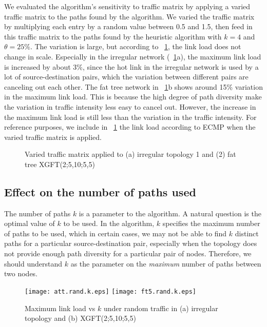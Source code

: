 \documentclass[conference]{IEEEtran}
\begin{document}
We evaluated the algorithm's sensitivity to traffic matrix by applying a varied
traffic matrix to the paths found by the algorithm. We varied the traffic
matrix by multiplying each entry by a random value between 0.5 and 1.5, then
feed in this traffic matrix to the paths found by the heuristic algorithm with
$k=4$ and $\theta=25\%$. The variation is large, but according to
\figurename~\ref{fig:var}, the link load does not change in scale. Especially
in the irregular network (\figurename~\ref{fig:var}a), the maximum link load is
increased by about 3\%, since the hot link in the irregular network is used by
a lot of source-destination pairs, which the variation between different pairs
are canceling out each other. The fat tree network in
\figurename~\ref{fig:var}b shows around 15\% variation in the maximum link load.
This is because the high degree of path diversity make the variation in
traffic intensity less easy to cancel out. However, the increase in the maximum
link load is still less than the variation in the traffic intensity.  For
reference purposes, we include in \figurename~\ref{fig:var} the link load
according to ECMP when the varied traffic matrix is applied.

\begin{figure}
\caption{Varied traffic matrix applied to (a) irregular topology 1 and (2) fat tree XGFT(2;5,10;5,5)}\label{fig:var}
\end{figure}


\subsection{Effect on the number of paths used}\label{sub:k}

The number of paths $k$ is a parameter to the algorithm. A natural question is
the optimal value of $k$ to be used. In the algorithm, $k$ specifies the
maximum number of paths to be used, which in certain cases, we may not be able
to find $k$ distinct paths for a particular source-destination pair, especially
when the topology does not provide enough path diversity for a particular pair
of nodes. Therefore, we should understand $k$ as the parameter on the
\emph{maximum} number of paths between two nodes.

\begin{figure}
\texttt{[image: att.rand.k.eps]}%
\texttt{[image: ft5.rand.k.eps]}
\caption{Maximum link load vs $k$ under random traffic in (a) irregular topology and (b) XGFT(2;5,10;5,5)}\label{fig:krand}
\end{figure}
\end{document}
